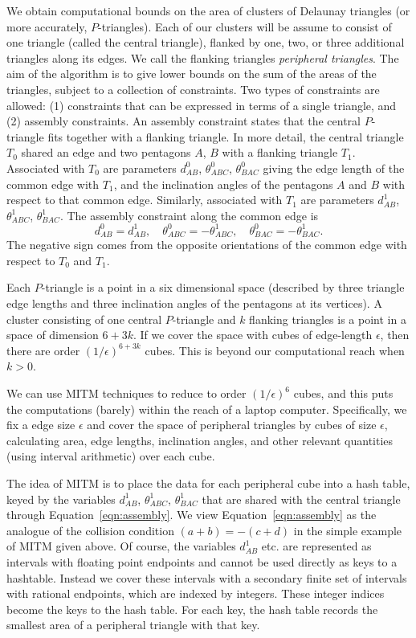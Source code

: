 We obtain computational bounds on the area of clusters of Delaunay triangles (or more accurately, $P$-triangles).
Each of our clusters will be assume to consist of one triangle (called the central triangle), flanked 
 by one, two, or three additional triangles along its edges.  We call the flanking triangles {\it peripheral triangles}.
The aim of the algorithm is to give lower bounds
on the sum of the areas of the triangles, subject to a collection of constraints.  Two types of constraints are
allowed: (1) constraints that can be expressed in terms of a single triangle, and (2) assembly constraints.
An assembly constraint states that the central $P$-triangle fits together with a flanking triangle.  
In more detail, the central triangle $T_0$ shared an edge and two pentagons $A$, $B$ with a flanking triangle $T_1$.
Associated with $T_0$ are parameters $d^0_{AB}$, $\theta^0_{ABC}$, $\theta^0_{BAC}$ giving the edge length of the
common edge with $T_1$, and the inclination angles of the pentagons $A$ and $B$ with respect to that common edge.
Similarly, associated with $T_1$ are parameters $d^1_{AB}$, $\theta^1_{ABC}$, $\theta^1_{BAC}$.  The assembly constraint
along the common edge is
\begin{equation}\label{eqn:assembly}
d^0_{AB} = d^1_{AB},\quad \theta^0_{ABC} = -\theta^1_{ABC},\quad \theta^0_{BAC} = -\theta^1_{BAC}.
\end{equation}
The negative sign comes from the opposite orientations of the common edge with respect to $T_0$ and $T_1$.

Each $P$-triangle is a point in a six dimensional space
(described by three triangle edge lengths and three inclination angles of the pentagons
at its vertices).  A cluster consisting of one central $P$-triangle and $k$ flanking triangles is a point in a
space of dimension
$6 + 3k$.  If we cover the space with cubes of edge-length $\epsilon$, then there are order $(1/\epsilon)^{6+3k}$
cubes.  This is beyond our computational reach when $k>0$.

We can use MITM techniques to reduce to order $(1/\epsilon)^6$ cubes, and this puts the computations (barely) within the
reach of a laptop computer.  Specifically, we fix a edge size $\epsilon$ and cover the space of peripheral triangles
by cubes of size $\epsilon$, calculating area, edge lengths, inclination angles, and other relevant quantities
 (using interval arithmetic) over each cube.   

The idea of MITM is to place the data for each peripheral cube into a hash table, keyed by the  variables
$d^1_{AB}$, $\theta^1_{ABC}$, $\theta^1_{BAC}$ that are shared with the central triangle through Equation~\ref{eqn:assembly}.
We view Equation~\ref{eqn:assembly} as the analogue of the collision condition $(a+b) = -(c+d)$ in
the simple example of MITM given above.  Of course, the variables $d^1_{AB}$ etc. are represented as intervals
with floating point endpoints and cannot be used directly as keys to a hashtable.  Instead we cover these intervals
with a secondary finite set of intervals with rational endpoints, which are indexed by integers.  These integer indices
become the keys to the hash table.    For each key, the hash table records the smallest  area of a peripheral triangle with
that key.

